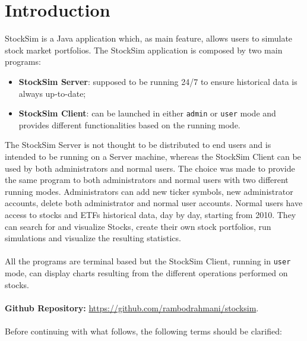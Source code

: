\chapter{Introduction}
StockSim is a Java application which, as main feature, allows users to simulate 
stock market portfolios. The StockSim application is composed by two main 
programs:
\begin{itemize}
    \item \textbf{StockSim Server}: supposed to be running 24/7 to ensure 
            historical data is always up-to-date;
    \item \textbf{StockSim Client}: can be launched in either \texttt{admin} or 
            \texttt{user} mode and provides different functionalities based on
            the running mode.
\end{itemize}
The StockSim Server is not thought to be distributed to end users and is
intended to be running on a Server machine, whereas the StockSim Client can be
used by both administrators and normal users. The choice was made to provide the
same program to both administrators and normal users with two different running
modes. Administrators can add new ticker symbols, new administrator accounts,
delete both administrator and normal user accounts. Normal users have access to
stocks and ETFs historical data, day by day, starting from 2010. They can search
for and visualize Stocks, create their own stock portfolios, run simulations and
visualize the resulting statistics.\\
\\
All the programs are terminal based but the StockSim Client, running in
\texttt{user} mode, can display charts resulting from the different operations
performed on stocks.\\
\\
\textbf{Github Repository:} \url{https://github.com/rambodrahmani/stocksim}.\\
\\
Before continuing with what follows, the following terms should be clarified:
